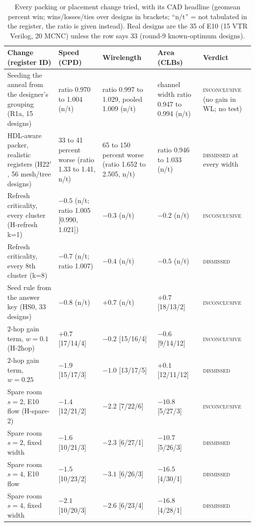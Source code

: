 \begin{table}[t]
\centering
\caption{Every packing or placement change tried, with its CAD headline (geomean percent win; wins/losses/ties over designs in brackets; ``n/t'' = not tabulated in the register, the ratio is given instead). Real designs are the 35 of E10 (15 VTR Verilog, 20 MCNC) unless the row says 33 (round-9 known-optimum designs).}
\label{tab:tried}
\footnotesize
\setlength{\tabcolsep}{3pt}
\begin{tabular}{@{}p{3.9cm}p{2.9cm}p{2.9cm}p{2.9cm}p{3.6cm}@{}}
\toprule
Change (register ID) & Speed (CPD) & Wirelength & Area (CLBs) & Verdict \\
\midrule
Seeding the anneal from the designer's grouping (R1a, 15 designs) & ratio 0.970 to 1.004 (n/t) & ratio 0.997 to 1.029, pooled 1.009 (n/t) & channel width ratio 0.947 to 0.994 (n/t) & \textsc{inconclusive} (no gain in WL; no test) \\
HDL-aware packer, realistic registers (H22$'$, 56 mesh/tree designs) & 33 to 41 percent worse (ratio 1.33 to 1.41, n/t) & 65 to 150 percent worse (ratio 1.652 to 2.505, n/t) & ratio 0.946 to 1.033 (n/t) & \textsc{dismissed} at every width \\
Refresh criticality, every cluster (H-refresh k=1) & $-0.5$ (n/t; ratio 1.005 [0.990, 1.021]) & $-0.3$ (n/t) & $-0.2$ (n/t) & \textsc{inconclusive} \\
Refresh criticality, every 8th cluster (k=8) & $-0.7$ (n/t; ratio 1.007) & $-0.4$ (n/t) & $-0.5$ (n/t) & \textsc{dismissed} \\
Seed rule from the answer key (HS0, 33 designs) & $-0.8$ (n/t) & $+0.7$ (n/t) & $+0.7$ [18/13/2] & \textsc{inconclusive} \\
2-hop gain term, $w=0.1$ (H-2hop) & $+0.7$ [17/14/4] & $-0.2$ [15/16/4] & $-0.6$ [9/14/12] & \textsc{inconclusive} \\
2-hop gain term, $w=0.25$ & $-1.9$ [15/17/3] & $-1.0$ [13/17/5] & $+0.1$ [12/11/12] & \textsc{dismissed} \\
Spare room $s=2$, E10 flow (H-spare-2) & $-1.4$ [12/21/2] & $-2.2$ [7/22/6] & $-10.8$ [5/27/3] & \textsc{inconclusive} \\
Spare room $s=2$, fixed width & $-1.6$ [10/21/3] & $-2.3$ [6/27/1] & $-10.7$ [5/26/3] & \textsc{dismissed} \\
Spare room $s=4$, E10 flow & $-1.5$ [10/23/2] & $-3.1$ [6/26/3] & $-16.5$ [4/30/1] & \textsc{dismissed} \\
Spare room $s=4$, fixed width & $-2.1$ [10/20/3] & $-2.6$ [6/23/4] & $-16.8$ [4/28/1] & \textsc{dismissed} \\

\end{tabular}
\end{table}
